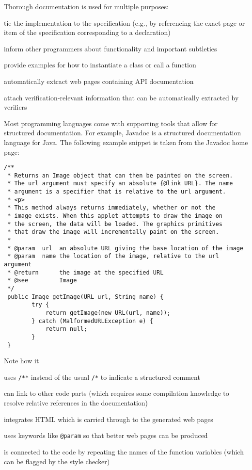 Thorough documentation is used for multiple purposes:
\begin{compactitem}
 \item tie the implementation to the specification (e.g., by referencing the exact page or item of the specification corresponding to a declaration)
 \item inform other programmers about functionality and important subtleties
 \item provide examples for how to instantiate a class or call a function
 \item automatically extract web pages containing API documentation
 \item attach verification-relevant information that can be automatically extracted by verifiers
\end{compactitem}

Most programming languages come with supporting tools that allow for structured documentation. 
For example, Javadoc is a structured documentation language for Java.
The following example snippet is taken from the Javadoc home page:

\begin{lstlisting}
/**
 * Returns an Image object that can then be painted on the screen. 
 * The url argument must specify an absolute {@link URL}. The name
 * argument is a specifier that is relative to the url argument. 
 * <p>
 * This method always returns immediately, whether or not the 
 * image exists. When this applet attempts to draw the image on
 * the screen, the data will be loaded. The graphics primitives 
 * that draw the image will incrementally paint on the screen. 
 *
 * @param  url  an absolute URL giving the base location of the image
 * @param  name the location of the image, relative to the url argument
 * @return      the image at the specified URL
 * @see         Image
 */
 public Image getImage(URL url, String name) {
        try {
            return getImage(new URL(url, name));
        } catch (MalformedURLException e) {
            return null;
        }
 }
\end{lstlisting}

Note how it
\begin{compactitem}
 \item uses \lstinline|/**| instead of the usual \lstinline|/*| to indicate a structured comment
 \item can link to other code parts (which requires some compilation knowledge to resolve relative references in the documentation)
 \item integrates HTML which is carried through to the generated web pages
 \item uses keywords like \lstinline|@param| so that better web pages can be produced
 \item is connected to the code by repeating the names of the function variables (which can be flagged by the style checker)
\end{compactitem}

